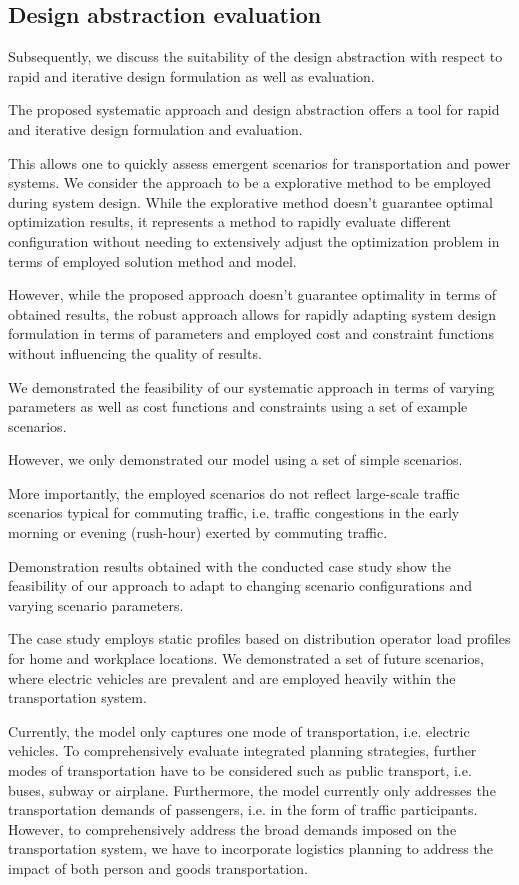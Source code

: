 \subsection{Design abstraction evaluation}
\label{discussion}
Subsequently, we discuss the suitability of the design abstraction with respect to rapid and iterative design formulation as well as evaluation.

The proposed systematic approach and design abstraction offers a tool for rapid and iterative design formulation and evaluation. 

This allows one to quickly assess emergent scenarios for transportation and power systems. We consider the approach to be a explorative method to be employed during system design. While the explorative method doesn't guarantee optimal optimization results, it represents a method to rapidly evaluate different configuration without needing to extensively adjust the optimization problem in terms of employed solution method and model.

However, while the proposed approach doesn't guarantee optimality in terms of obtained results, the robust approach allows for rapidly adapting system design formulation in terms of parameters and employed cost and constraint functions without influencing the quality of results. 

We demonstrated the feasibility of our systematic approach in terms of varying parameters as well as cost functions and constraints using a set of example scenarios.

However, we only demonstrated our model using a set of simple scenarios. 

More importantly, the employed scenarios do not reflect large-scale traffic scenarios typical for commuting traffic, i.e. traffic congestions in the early morning or evening (rush-hour) exerted by commuting traffic.

Demonstration results obtained with the conducted case study show the feasibility of our approach to adapt to changing scenario configurations and varying scenario parameters.

The case study employs static profiles based on distribution operator load profiles for home and workplace locations. We demonstrated a set of future scenarios, where electric vehicles are prevalent and are employed heavily within the transportation system. 

Currently, the model only captures one mode of transportation, i.e. electric vehicles. To comprehensively evaluate integrated planning strategies, further modes of transportation have to be considered such as public transport, i.e. buses, subway or airplane. Furthermore, the model currently only addresses the transportation demands of passengers, i.e. in the form of traffic participants. However, to comprehensively address the broad demands imposed on the transportation system, we have to incorporate logistics planning to address the impact of both person and goods transportation. 


